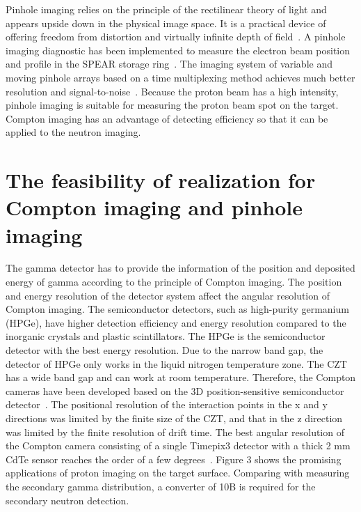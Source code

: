 \documentclass[a4paper,11pt]{article}
\begin{document}
Pinhole imaging relies on the principle of the rectilinear theory of light and appears upside down in the physical image space. It is a practical device of offering freedom from distortion and virtually infinite depth of field~\cite{PhiholeOptics}. A pinhole imaging diagnostic has been implemented to measure the electron beam position and profile in the SPEAR storage ring~\cite{PinholeImagingForBeam}. The imaging system of variable and moving pinhole arrays based on a time multiplexing method achieves much better resolution and signal-to-noise~\cite{PinholeImagingForOptical}. Because the proton beam has a high intensity, pinhole imaging is suitable for measuring the proton beam spot on the target. Compton imaging has an advantage of detecting efficiency so that it can be applied to the neutron imaging. 


\section{The feasibility of realization for Compton imaging and pinhole imaging}


The gamma detector has to provide the information of the position and deposited energy of gamma according to the principle of Compton imaging. The position and energy resolution of the detector system affect the angular resolution of Compton imaging. The semiconductor detectors, such as high-purity germanium (HPGe), have higher detection efficiency and energy resolution compared to the inorganic crystals and plastic scintillators. The HPGe is the semiconductor detector with the best energy resolution. Due to the narrow band gap, the detector of HPGe only works in the liquid nitrogen temperature zone. The CZT has a wide band gap and can work at room temperature. Therefore, the Compton cameras have been developed based on the 3D position-sensitive semiconductor detector~\cite{H3D1, H3D2, H3D3, H3D4}. The positional resolution of the interaction points in the x and y directions was limited by the finite size of the CZT, and that in the z direction was limited by the finite resolution of drift time. The best angular resolution of the Compton camera consisting of a single Timepix3 detector with a thick 2 mm CdTe sensor reaches the order of a few degrees~\cite{BestComptonImage1, BestComptonImage2}. Figure 3 shows the promising applications of proton imaging on the target surface. Comparing with measuring the secondary gamma distribution, a converter of 10B is required for the secondary neutron detection.
\end{document}
